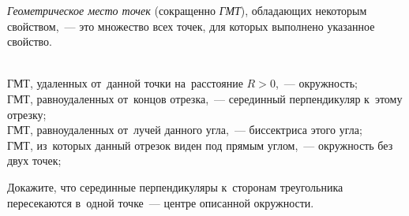 


\emph{Геометрическое место точек} (сокращенно \emph{ГМТ}), обладающих некоторым
свойством,~--- это множество всех точек, для которых выполнено указанное
свойство.

\resetsubproblem
\\
\subproblem
ГМТ, удаленных от~данной точки на~расстояние $R > 0$,~--- окружность;
\\
\subproblem
ГМТ, равноудаленных от~концов отрезка,~--- серединный перпендикуляр к~этому
отрезку;
\\
\subproblem
ГМТ, равноудаленных от~лучей данного угла,~--- биссектриса этого угла;
\\
\subproblem
ГМТ, из~которых данный отрезок виден под прямым углом,~--- окружность без двух
точек;


Докажите, что серединные перпендикуляры к~сторонам треугольника пересекаются
в~одной точке~--- центре описанной окружности.

